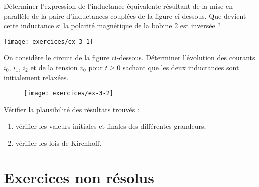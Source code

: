 \begin{exercise}{}
	\label{ex:2-1}
	Déterminer l'expression de l'inductance équivalente résultant de la mise en
	parallèle de la paire d'inductances couplées de la figure ci-dessous.
	Que devient cette inductance si la polarité magnétique de la bobine 2 est inversée ?
	\begin{center}
		\texttt{[image: exercices/ex-3-1]}
	\end{center}
	
	
\end{exercise}

\begin{exercise}{}
	\label{ex:2-2}
	On considère le circuit de la figure ci-dessous.  Déterminer
	l'évolution des courants $i_0$, $i_1$, $i_2$ et de la tension $v_0$ pour
	$t\geq 0$ sachant que les deux inductances sont initialement relaxées.
	\begin{figure}[h]
		\begin{center}
			\texttt{[image: exercices/ex-3-2]}
		\end{center}
		\caption{}\label{ex3-2}
	\end{figure}
	Vérifier la plausibilité des résultats trouvés :
	\begin{enumerate}
		\item vérifier les valeurs initiales et finales des différentes grandeurs;
		\item vérifier les lois de Kirchhoff.
	\end{enumerate}
	
\end{exercise}

\section{Exercices non résolus}


